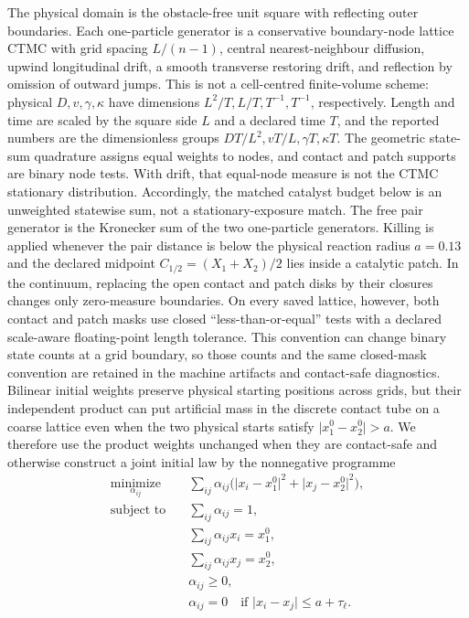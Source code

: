 \documentclass[aps,pre,reprint,amsmath,amssymb,longbibliography,floatfix]{revtex4-2}
\begin{document}
The physical domain is the obstacle-free unit square with reflecting outer
boundaries. Each one-particle generator is a conservative boundary-node lattice
CTMC with grid spacing \(L/(n-1)\), central nearest-neighbour diffusion, upwind
longitudinal drift, a smooth transverse restoring drift, and reflection by
omission of outward jumps. This is not a cell-centred finite-volume scheme:
physical \(D,v,\gamma,\kappa\) have dimensions
\(L^2/T,L/T,T^{-1},T^{-1}\), respectively. Length and time are scaled by the
square side \(L\) and a declared time \(T\), and the reported numbers are the
dimensionless groups \(DT/L^2,vT/L,\gamma T,\kappa T\).
The geometric state-sum quadrature assigns equal weights to nodes, and contact
and patch supports are binary node tests. With drift, that equal-node measure
is not the CTMC stationary distribution. Accordingly, the matched catalyst
budget below is an unweighted statewise sum, not a stationary-exposure match.
The free pair generator is the Kronecker sum of the two
one-particle generators. Killing is applied whenever the pair distance is
below the physical reaction radius \(a=0.13\) and the declared midpoint
\(C_{1/2}=(X_1+X_2)/2\) lies inside a catalytic patch.
In the continuum, replacing the open contact and patch disks by their closures
changes only zero-measure boundaries. On every saved lattice, however, both
contact and patch masks use closed ``less-than-or-equal'' tests with a declared
scale-aware floating-point length tolerance. This convention can change binary
state counts at a grid boundary, so those counts and the same closed-mask
convention are retained in the machine artifacts and contact-safe diagnostics.
Bilinear initial weights
preserve physical starting positions across grids, but their independent
product can put artificial mass in the discrete contact tube on a coarse
lattice even when the two physical starts satisfy
\(\lvert x_1^0-x_2^0\rvert>a\). We therefore use the product weights unchanged
when they are contact-safe and otherwise construct a joint initial law by the
nonnegative programme
\begin{equation}
\begin{aligned}
\underset{\alpha_{ij}}{\operatorname{minimize}}\quad
&\sum_{ij}\alpha_{ij}
\bigl(\lvert x_i-x_1^0\rvert^2+\lvert x_j-x_2^0\rvert^2\bigr),\\
\text{subject to}\quad &\sum_{ij}\alpha_{ij}=1,\\
&\sum_{ij}\alpha_{ij}x_i=x_1^0,\\
&\sum_{ij}\alpha_{ij}x_j=x_2^0,\\
&\alpha_{ij}\geq0,\\
&\alpha_{ij}=0\quad\text{if }\lvert x_i-x_j\rvert\leq a+\tau_\ell.
\end{aligned}
\label{eq:contact-safe-initial}
\end{equation}
\end{document}
